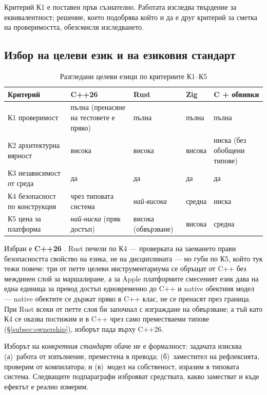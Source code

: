 Критерий К1 е поставен пръв съзнателно. Работата изследва твърдение за еквивалентност;
решение, което подобрява който и да е друг критерий за сметка на проверимостта, обезсмисля
изследването.

\subsection{Избор на целеви език и на езиковия стандарт}
\label{subsec:language}

\begin{table}[H]
\caption{Разгледани целеви езици по критериите К1--К5}
\label{tab:languages}
\centering\small
\begin{tabular}{@{}L{2.6cm}L{2.7cm}L{2.7cm}L{2.7cm}L{2.7cm}@{}}
\hline
\textbf{Критерий} & \textbf{C++26} & \textbf{Rust} & \textbf{Zig} & \textbf{C + обвивки} \\
\hline
К1 проверимост & пълна (пренасяне на тестовете е пряко) & пълна & пълна & пълна \\
К2 архитектурна вярност & висока & висока & висока & ниска (без обобщени типове) \\
К3 независимост от среда & да & да & да & да \\
К4 безопасност по конструкция & чрез типовата система & \emph{най-висока} & средна & ниска \\
К5 цена за платформа & \emph{най-ниска} (пряк достъп) & висока (обвързване) & висока & средна \\
\hline
\end{tabular}
\end{table}

Избран е \textbf{C++26} . Rust печели по К4 --- проверката на
заемането прави безопасността свойство на езика, не на дисциплината --- но губи по К5,
който тук тежи повече: три от петте целеви инструментариума се обръщат от C++ без
междинен слой за маршалиране, а за Apple платформите смесеният език дава на една единица
за превод достъп едновременно до C++ и native обектния модел --- native обектите се държат
пряко в C++ клас, не се пренасят през граница. При Rust всеки от петте слоя би започнал с
изграждане на обвързване; а тъй като К4 се оказва постижим и в C++ чрез само преместваеми
типове (§\ref{subsec:ownership}), изборът пада върху C++26.

Изборът на \emph{конкретния стандарт} обаче не е формалност: задачата изисква (а)~работа
от изпълнение, преместена в превода; (б)~заместител на рефлексията, проверим от
компилатора; и (в)~модел на собственост, изразим в типовата система. Следващите
подпараграфи изброяват средствата, какво заместват и къде ефектът е реално измерим.

